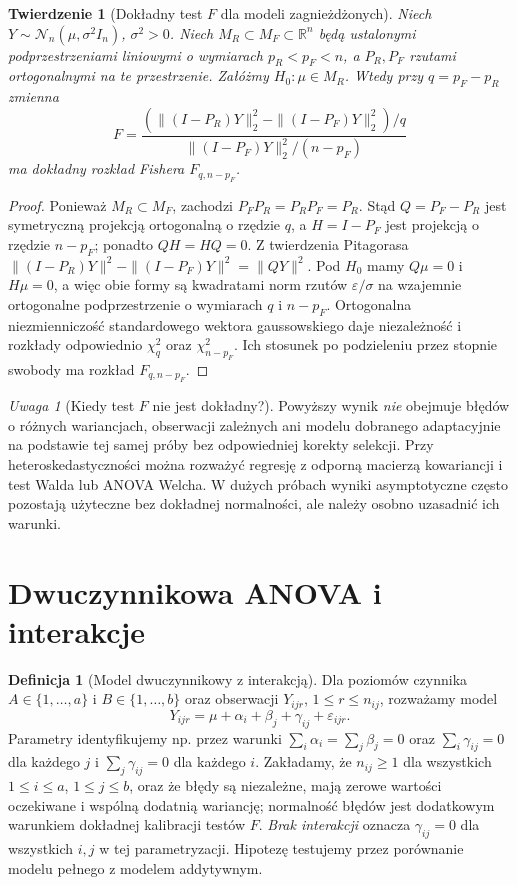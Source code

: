 \documentclass[11pt,a4paper,oneside]{report}
\numberwithin{equation}{chapter}
\theoremstyle{plain}
\newtheorem{twierdzenie}{Twierdzenie}[chapter]
\theoremstyle{definition}
\newtheorem{definicja}{Definicja}[chapter]
\theoremstyle{remark}
\newtheorem{uwaga}{Uwaga}[chapter]
\newcommand{\R}{\mathbb R}
\newcommand{\Normal}{\mathcal N}
\begin{document}
\begin{twierdzenie}[Dokładny test $F$ dla modeli zagnieżdżonych]\label{thm:nested-F-anova}
Niech $Y\sim\Normal_n(\mu,\sigma^2 I_n)$, $\sigma^2>0$. Niech $M_R\subset M_F\subset\R^n$ będą ustalonymi podprzestrzeniami liniowymi o wymiarach $p_R<p_F<n$, a $P_R,P_F$ rzutami ortogonalnymi na te przestrzenie. Załóżmy $H_0:\mu\in M_R$. Wtedy przy $q=p_F-p_R$ zmienna
\[
 F=\frac{(\|(I-P_R)Y\|_2^2-\|(I-P_F)Y\|_2^2)/q}{\|(I-P_F)Y\|_2^2/(n-p_F)}
\]
ma dokładny rozkład Fishera $F_{q,n-p_F}$.
\end{twierdzenie}
\begin{proof}
Ponieważ $M_R\subset M_F$, zachodzi $P_FP_R=P_RP_F=P_R$. Stąd $Q=P_F-P_R$ jest symetryczną projekcją ortogonalną o rzędzie $q$, a $H=I-P_F$ jest projekcją o rzędzie $n-p_F$; ponadto $QH=HQ=0$. Z twierdzenia Pitagorasa $\|(I-P_R)Y\|^2-\|(I-P_F)Y\|^2=\|QY\|^2$. Pod $H_0$ mamy $Q\mu=0$ i $H\mu=0$, a więc obie formy są kwadratami norm rzutów $\varepsilon/\sigma$ na wzajemnie ortogonalne podprzestrzenie o wymiarach $q$ i $n-p_F$. Ortogonalna niezmienniczość standardowego wektora gaussowskiego daje niezależność i rozkłady odpowiednio $\chi_q^2$ oraz $\chi_{n-p_F}^2$. Ich stosunek po podzieleniu przez stopnie swobody ma rozkład $F_{q,n-p_F}$.
\end{proof}

\begin{uwaga}[Kiedy test $F$ nie jest dokładny?]
Powyższy wynik \emph{nie} obejmuje błędów o różnych wariancjach, obserwacji zależnych ani modelu dobranego adaptacyjnie na podstawie tej samej próby bez odpowiedniej korekty selekcji. Przy heteroskedastyczności można rozważyć regresję z odporną macierzą kowariancji i test Walda lub ANOVA Welcha. W dużych próbach wyniki asymptotyczne często pozostają użyteczne bez dokładnej normalności, ale należy osobno uzasadnić ich warunki.
\end{uwaga}

\section{Dwuczynnikowa ANOVA i interakcje}
\begin{definicja}[Model dwuczynnikowy z interakcją]\label{def:two-way-anova}
Dla poziomów czynnika $A\in\{1,\ldots,a\}$ i $B\in\{1,\ldots,b\}$ oraz obserwacji $Y_{ijr}$, $1\le r\le n_{ij}$, rozważamy model
\[
 Y_{ijr}=\mu+\alpha_i+\beta_j+\gamma_{ij}+\varepsilon_{ijr}.
\]
Parametry identyfikujemy np. przez warunki $\sum_i\alpha_i=\sum_j\beta_j=0$ oraz $\sum_i\gamma_{ij}=0$ dla każdego $j$ i $\sum_j\gamma_{ij}=0$ dla każdego $i$. Zakładamy, że $n_{ij}\ge1$ dla wszystkich $1\le i\le a$, $1\le j\le b$, oraz że błędy są niezależne, mają zerowe wartości oczekiwane i wspólną dodatnią wariancję; normalność błędów jest dodatkowym warunkiem dokładnej kalibracji testów $F$. \emph{Brak interakcji} oznacza $\gamma_{ij}=0$ dla wszystkich $i,j$ w tej parametryzacji. Hipotezę testujemy przez porównanie modelu pełnego z modelem addytywnym.
\end{definicja}
\end{document}
